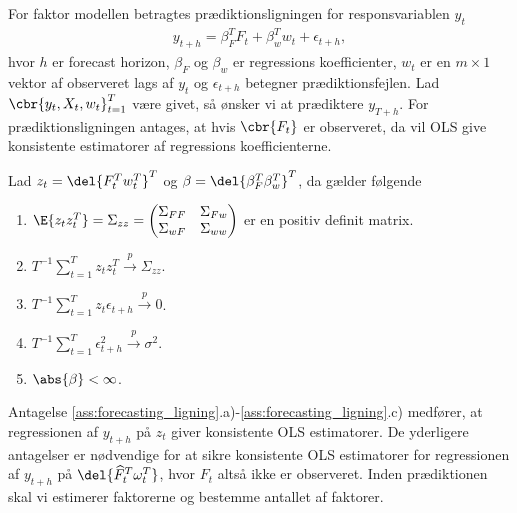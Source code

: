 For faktor modellen betragtes prædiktionsligningen for responsvariablen \(y_t\)
\begin{align}
y_{t+h} = \beta_F^T F_t + \beta_w^T w_t + \epsilon_{t+h}, \label{eq:factor_model_forecast}
\end{align}
hvor \(h\) er forecast horizon, \(\beta_F\) og \(\beta_w\) er regressions koefficienter, \(w_t\) er en \(m \times 1\) vektor af observeret lags af \(y_t\) og \(\epsilon_{t+h}\) betegner prædiktionsfejlen.
Lad  \(\cbr{y_t, X_t, w_t}_{t=1}^T\) være givet, så ønsker vi at prædiktere \(y_{T+h}\).
For prædiktionsligningen antages, at hvis \(\cbr{F_t}\) er observeret, da vil OLS give konsistente estimatorer af regressions koefficienterne.
%
\begin{ass} \label{ass:forecasting_ligning}
Lad \(z_t = \del{F_t^T w_t^T}^T\) og \(\beta = \del{\beta_F^T \beta_w^T}^T\), da gælder følgende
\begin{enumerate}[label=\alph*)]
\item \(\E{z_t z_t^T} = \Sigma_{zz} = \begin{pmatrix}
\Sigma_{FF} & \Sigma_{F w} \\
\Sigma_{w F} & \Sigma_{w w}
\end{pmatrix} \) er en positiv definit matrix.
\item \(T^{-1} \sum_{t=1}^T z_t z_t^T \overset{p}{\rightarrow} \Sigma_{zz}\).
\item \(T^{-1} \sum_{t=1}^T z_t \epsilon_{t+h} \overset{p}{\rightarrow} 0\).
\item  \(T^{-1} \sum_{t=1}^T \epsilon_{t+h}^2 \overset{p}{\rightarrow} \sigma^2\).
\item \(\abs{\beta} < \infty\).
\end{enumerate}
\end{ass}
%
Antagelse \ref{ass:forecasting_ligning}.a)-\ref{ass:forecasting_ligning}.c) medfører, at regressionen af \(y_{t+h}\) på $z_t$ giver konsistente OLS estimatorer.
De yderligere antagelser er nødvendige for at sikre konsistente OLS estimatorer for regressionen af \(y_{t+h}\) på \(\del{\widehat{F}_t^T \omega_t^T}\), hvor \(F_t\) altså ikke er observeret.
Inden prædiktionen skal vi estimerer faktorerne og bestemme antallet af faktorer.

